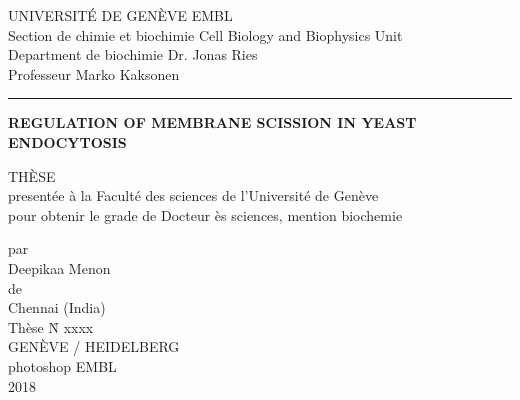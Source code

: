 \documentclass[
12pt, %
ngerman,
english, %
onehalfspacing,
hidelinks,
toctotoc, %
headsepline, %
]{MastersDoctoralThesis} %
\author{Markus Mund} %
\newcommand\blankpage{%
	\null
	\thispagestyle{empty}%
	\newpage}
\begin{document}
\frontmatter %

\pagestyle{plain} %

%
\begin{titlepage}

\noindent\large{UNIVERSIT\'E DE GEN\`EVE\hspace*{\fill} EMBL\\
Section de chimie et biochimie\hspace*{\fill} Cell Biology and Biophysics Unit\\
Department de biochimie\hspace*{\fill} Dr. Jonas Ries\\}
Professeur Marko Kaksonen\\
\noindent\rule{13.6cm}{0.4pt}

\vspace{3cm}
\begin{center}
\LARGE\textbf{REGULATION OF MEMBRANE SCISSION IN YEAST ENDOCYTOSIS} \\
	\vspace{3cm}
\end{center}

\begin{center}	
	{TH\`ESE\\
	present\'ee \`a la Facult\'e des sciences de l'Universit\'e de Gen\`eve\\
	pour obtenir le grade de Docteur \`es sciences, mention biochemie\\}

\vspace{1.5cm}
	par\\
	Deepikaa Menon\\
	\vspace{1cm}
	de\\
	Chennai (India)\\
	\vspace{2cm}
	Th\`ese N\r{} xxxx\\
	\vspace{1cm}
	GEN\`EVE / HEIDELBERG\\
	photoshop EMBL\\	
	2018\\
	
	
\end{center}

\end{titlepage}
\end{document}
